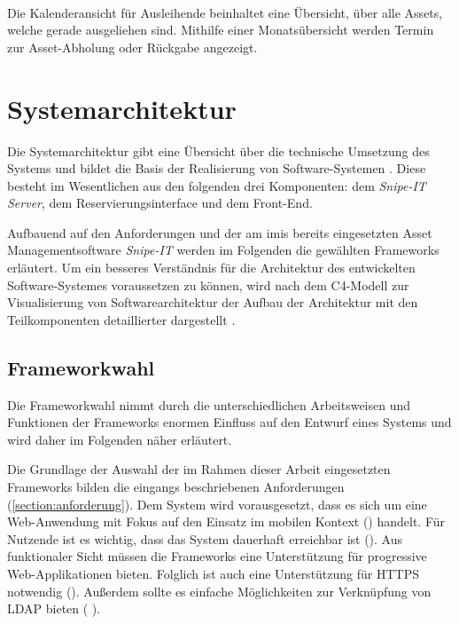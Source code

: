 {\sffamily\color{maincolor}{Ft-B-4 | Kalenderansicht für Ausleihende}}\\
Die Kalenderansicht für Ausleihende beinhaltet eine Übersicht, über alle Assets,
welche gerade ausgeliehen sind. Mithilfe einer Monatsübersicht werden Termin zur
Asset-Abholung oder Rückgabe angezeigt.


\section{Systemarchitektur}
Die Systemarchitektur gibt eine Übersicht über die technische Umsetzung des
Systems und bildet die Basis der Realisierung von Software-Systemen
\cite{dumke_software-metriken_2000}. Diese besteht im Wesentlichen aus den
folgenden drei Komponenten: dem \textit{Snipe-IT Server}, dem
Reservierungsinterface und dem Front-End.

Aufbauend auf den Anforderungen und der am \ac{imis} bereits eingesetzten Asset Managementsoftware
\textit{Snipe-IT} werden im Folgenden die gewählten Frameworks erläutert. Um ein besseres
Verständnis für die Architektur des entwickelten Software-Systemes voraussetzen zu können, wird nach
dem C4-Modell zur Visualisierung von Softwarearchitektur der Aufbau der Architektur mit den
Teilkomponenten detaillierter dargestellt \cite{brown2013software}.

\subsection{Frameworkwahl}
Die Frameworkwahl nimmt durch die unterschiedlichen Arbeitsweisen und Funktionen
der Frameworks enormen Einfluss auf den Entwurf eines Systems und wird daher im
Folgenden näher erläutert.

Die Grundlage der Auswahl der im Rahmen dieser Arbeit eingesetzten Frameworks
bilden die eingangs beschriebenen Anforderungen (\ref{section:anforderung}). Dem
System wird vorausgesetzt, dass es sich um eine Web-Anwendung mit Fokus auf den
Einsatz im mobilen Kontext () handelt. Für Nutzende ist
es wichtig, dass das System dauerhaft erreichbar ist (). Aus
funktionaler Sicht müssen die Frameworks eine Unterstützung für progressive
Web-Applikationen bieten. Folglich ist auch eine Unterstützung für HTTPS
notwendig (). Außerdem sollte es einfache Möglichkeiten zur
Verknüpfung von LDAP bieten ( ).


